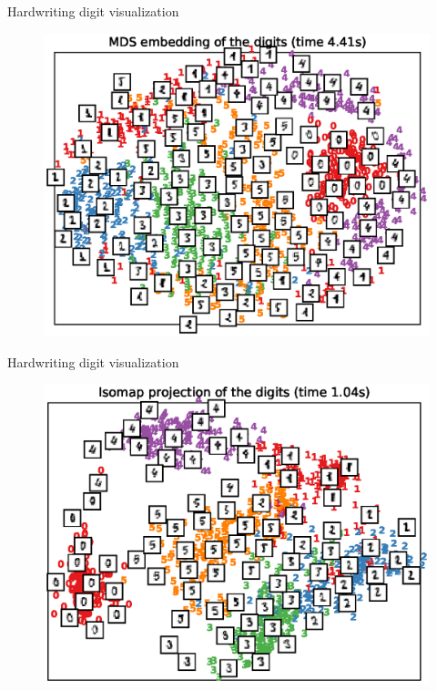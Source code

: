 \documentclass[10pt]{beamer}
\begin{document}
\begin{frame}{Hardwriting digit visualization}
\begin{figure}
\centering
\includegraphics[scale=0.65]{./image/experiment/mds.eps}
\end{figure}
\end{frame}


\begin{frame}{Hardwriting digit visualization}
\begin{figure}
\centering
\includegraphics[scale=0.65]{./image/experiment/isomap.eps}
\end{figure}
\end{frame}
\end{document}
